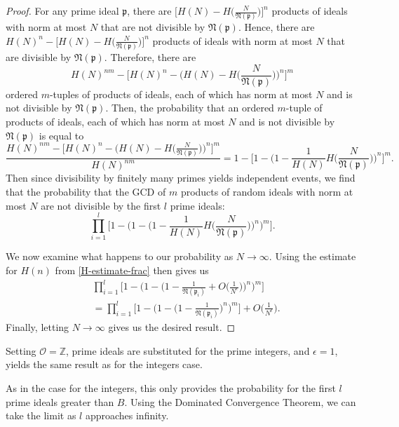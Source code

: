 \documentclass[12pt]{amsart}
\theoremstyle{definition}
\newcommand{\f}[1]{\mathfrak{#1}}
\begin{document}
\begin{proof}
	For any prime ideal $\mathfrak{p}$, there are $\bigl[H(N)-H\bigl(\frac{N}{\f{N(p)}}\bigr)\bigr]^n$ products of ideals with norm at most $N$ that are not divisible by $\f{N(p)}$. Hence, there are  $H(N)^n-\bigl[H(N)-H\bigl(\frac{N}{\f{N(p)}}\bigr)\bigr]^n$ products of ideals with norm at most \(N\) that are divisible by $\f{N(p)}$. Therefore, there are 
	$$H(N)^{nm}-\Big[H(N)^n - \Big(H(N) - H\Big(\frac{N}{\f{N(p)}}\Big)\Big)^n\Big]^m$$
	ordered $m$-tuples of products of ideals, each of which has norm at most $N$ and is not divisible by $\f{N(p)}$. Then, the probability that an ordered $m$-tuple of products of ideals, each of which has norm at most $N$ and is not divisible by $\f{N(p)}$ is equal to
	$$\frac{H(N)^{nm}-\Big[H(N)^n - \Big(H(N) - H\Big(\frac{N}{\f{N(p)}}\Big)\Big)^n\Big]^m}{H(N)^{nm}} = 1 - \Big[1 - \Big(1 - \frac{1}{H(N)} H\Big(\frac{N}{\f{N(p)}}\Big)\Big)^n\Big]^m.$$
	Then since divisibility by finitely many primes yields independent events, we find that the probability that the GCD of $m$ products of random ideals with norm at most $N$ are not divisible by the first $l$ prime ideals:
	$$\prod_{i=1}^{l} \Big[1 - \Big(1 - \Big(1 - \frac{1}{H(N)} H\Big(\frac{N}{\f{N(p)}}\Big)\Big)^n \Big)^m \Big].$$
	
	We now examine what happens to our probability as $N \to \infty$. Using the estimate for $H(n)$ from \cref{H-estimate-frac} then gives us
	\begin{align*}
		&\prod_{i=1}^{l} \Big[1 - \Big(1 - \Big(1 - \frac{1}{\f{N}(\f{p}_i)} + O\Big(\frac{1}{N^{\epsilon}}\Big) \Big)^n \Big)^m\Big]\\
		&=\prod_{i=1}^{l} \Big[1 - \Big(1 - \Big(1 - \frac{1}{\f{N}(\f{p}_i)}\Big)^n \Big)^m \Big] + O\Big(\frac{1}{N^{\epsilon}}\Big).
	\end{align*}
	Finally, letting $N\to\infty$ gives us the desired result. 
\end{proof}

Setting \(\mathcal{O}=\mathbb{Z}\), prime ideals are substituted for the prime integers, and \(\epsilon=1\), yields the same result as for the integers case. 


As in the case for the integers, this only provides the probability for the first \(l\) prime ideals greater than \(B\). Using the Dominated Convergence Theorem, we can take the limit as \(l\) approaches infinity.
\end{document}
